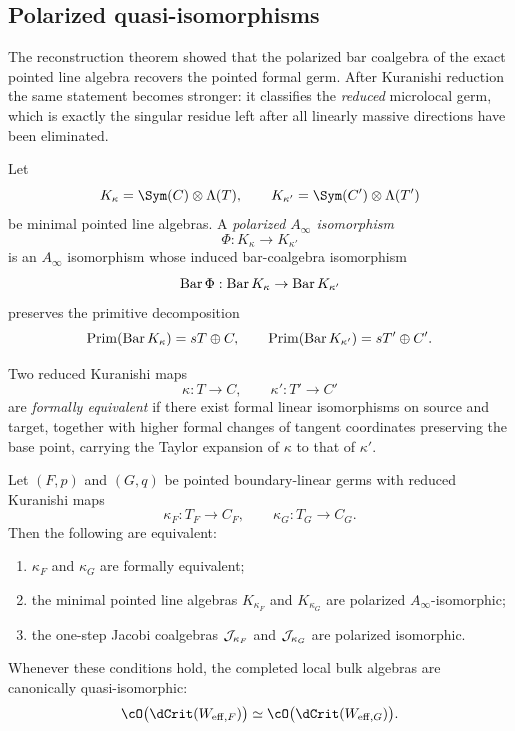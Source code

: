 \subsection{Polarized quasi-isomorphisms}

The reconstruction theorem showed that the polarized bar coalgebra of the exact pointed line algebra recovers the pointed formal germ. After Kuranishi reduction the same statement becomes stronger: it classifies the \emph{reduced} microlocal germ, which is exactly the singular residue left after all linearly massive directions have been eliminated.

\begin{definition}
Let
\[
K_\kappa=\Sym(C)\ot \Lambda(T),
\qquad
K_{\kappa'}=\Sym(C')\ot \Lambda(T')
\]
be minimal pointed line algebras. A \emph{polarized $A_\infty$ isomorphism}
\[
\Phi:K_\kappa\longrightarrow K_{\kappa'}
\]
is an $A_\infty$ isomorphism whose induced bar-coalgebra isomorphism
\[
\operatorname{Bar} \Phi:\operatorname{Bar} K_\kappa\to \operatorname{Bar} K_{\kappa'}
\]
preserves the primitive decomposition
\[
\mathrm{Prim}(\operatorname{Bar} K_\kappa)=sT\oplus C,
\qquad
\mathrm{Prim}(\operatorname{Bar} K_{\kappa'})=sT'\oplus C'.
\]
\end{definition}

\begin{definition}
Two reduced Kuranishi maps
\[
\kappa:T\to C,
\qquad
\kappa':T'\to C'
\]
are \emph{formally equivalent} if there exist formal linear isomorphisms on source and target, together with higher formal changes of tangent coordinates preserving the base point, carrying the Taylor expansion of $\kappa$ to that of $\kappa'$.
\end{definition}

\begin{theorem}\label{thm:line-mather-yau}
Let $(F,p)$ and $(G,q)$ be pointed boundary-linear germs with reduced Kuranishi maps
\[
\kappa_F:T_F\to C_F,
\qquad
\kappa_G:T_G\to C_G.
\]
Then the following are equivalent:
\begin{enumerate}[label=(\roman*),leftmargin=1.8em]
\item $\kappa_F$ and $\kappa_G$ are formally equivalent;
\item the minimal pointed line algebras $K_{\kappa_F}$ and $K_{\kappa_G}$ are polarized $A_\infty$-isomorphic;
\item the one-step Jacobi coalgebras $\mathcal J_{\kappa_F}$ and $\mathcal J_{\kappa_G}$ are polarized isomorphic.
\end{enumerate}
Whenever these conditions hold, the completed local bulk algebras are canonically quasi-isomorphic:
\[
\cO\bigl(\dCrit(W_{\eff,F})\bigr)\simeq \cO\bigl(\dCrit(W_{\eff,G})\bigr).
\]
\end{theorem}

